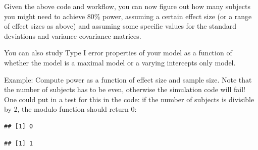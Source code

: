 \documentclass[12pt,]{krantz}
\newenvironment{Shaded}{\begin{snugshade}}{\end{snugshade}}
\newcommand{\DecValTok}[1]{\textcolor[rgb]{0.00,0.00,0.81}{#1}}
\newcommand{\OperatorTok}[1]{\textcolor[rgb]{0.81,0.36,0.00}{\textbf{#1}}}
\begin{document}
Given the above code and workflow, you can now figure out how many subjects you might need to achieve 80\% power, assuming a certain effect size (or a range of effect sizes as above) and assuming some specific values for the standard deviations and variance covariance matrices.

You can also study Type I error properties of your model as a function of whether the model is a maximal model or a varying intercepts only model.

Example: Compute power as a function of effect size and sample size. Note that the number of subjects has to be even, otherwise the simulation code will fail! One could put in a test for this in the code: if the number of subjects is divisible by 2, the modulo function should return 0:

\begin{Shaded}
\end{Shaded}

\begin{verbatim}
## [1] 0
\end{verbatim}

\begin{Shaded}
\end{Shaded}

\begin{verbatim}
## [1] 1
\end{verbatim}
\end{document}
